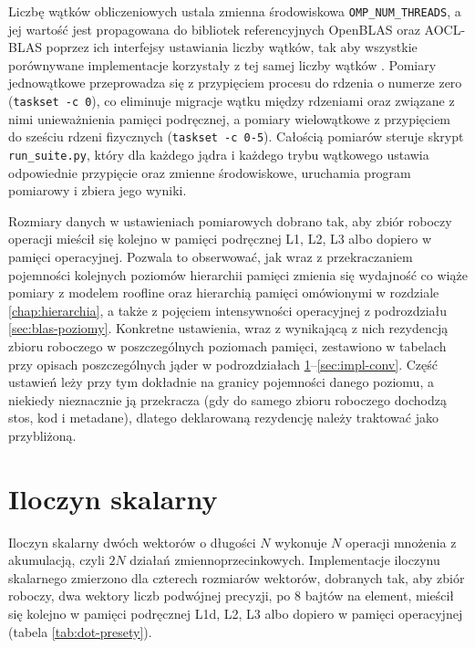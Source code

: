 \documentclass[a4paper,12pt]{book} %
\begin{document}
Liczbę wątków obliczeniowych ustala zmienna środowiskowa \texttt{OMP\_NUM\_THREADS}, a jej wartość jest propagowana do bibliotek referencyjnych OpenBLAS oraz AOCL-BLAS poprzez ich interfejsy ustawiania liczby wątków, tak aby wszystkie porównywane implementacje korzystały z tej samej liczby wątków \cite{openmp52}. Pomiary jednowątkowe przeprowadza się z przypięciem procesu do rdzenia o numerze zero (\texttt{taskset -c 0}), co eliminuje migracje wątku między rdzeniami oraz związane z nimi unieważnienia pamięci podręcznej, a pomiary wielowątkowe z przypięciem do sześciu rdzeni fizycznych (\texttt{taskset -c 0-5}). Całością pomiarów steruje skrypt \texttt{run\_suite.py}, który dla każdego jądra i każdego trybu wątkowego ustawia odpowiednie przypięcie oraz zmienne środowiskowe, uruchamia program pomiarowy i zbiera jego wyniki.

Rozmiary danych w ustawieniach pomiarowych dobrano tak, aby zbiór roboczy operacji mieścił się kolejno w pamięci podręcznej L1, L2, L3 albo dopiero w pamięci operacyjnej. Pozwala to obserwować, jak wraz z przekraczaniem pojemności kolejnych poziomów hierarchii pamięci zmienia się wydajność co wiąże pomiary z modelem roofline oraz hierarchią pamięci omówionymi w rozdziale \ref{chap:hierarchia}, a także z pojęciem intensywności operacyjnej z podrozdziału \ref{sec:blas-poziomy}. Konkretne ustawienia, wraz z wynikającą z nich rezydencją zbioru roboczego w poszczególnych poziomach pamięci, zestawiono w tabelach przy opisach poszczególnych jąder w podrozdziałach \ref{sec:impl-dot}--\ref{sec:impl-conv}. Część ustawień leży przy tym dokładnie na granicy pojemności danego poziomu, a niekiedy nieznacznie ją przekracza (gdy do samego zbioru roboczego dochodzą stos, kod i metadane), dlatego deklarowaną rezydencję należy traktować jako przybliżoną.

\section{Iloczyn skalarny}
\label{sec:impl-dot}

Iloczyn skalarny dwóch wektorów o długości $N$ wykonuje $N$ operacji mnożenia z akumulacją, czyli $2N$ działań zmiennoprzecinkowych. Implementacje iloczynu skalarnego zmierzono dla czterech rozmiarów wektorów, dobranych tak, aby zbiór roboczy, dwa wektory liczb podwójnej precyzji, po $8$ bajtów na element, mieścił się kolejno w pamięci podręcznej L1d, L2, L3 albo dopiero w pamięci operacyjnej (tabela \ref{tab:dot-presety}).
\end{document}
